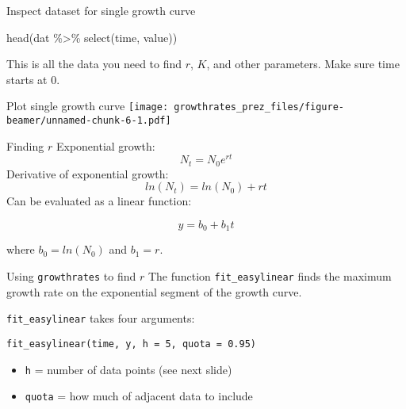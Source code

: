 \documentclass[
  ignorenonframetext,
]{beamer}
\newenvironment{Shaded}{\begin{snugshade}}{\end{snugshade}}
\newcommand{\FunctionTok}[1]{\textcolor[rgb]{0.00,0.00,0.00}{#1}}
\newcommand{\NormalTok}[1]{#1}
\newcommand{\SpecialCharTok}[1]{\textcolor[rgb]{0.00,0.00,0.00}{#1}}
\providecommand{\tightlist}{%
  \setlength{\itemsep}{0pt}\setlength{\parskip}{0pt}}
\begin{document}
\begin{frame}[fragile]{Inspect dataset for single growth curve}
\protect\hypertarget{inspect-dataset-for-single-growth-curve}{}
\begin{Shaded}
\begin{Highlighting}[]
\FunctionTok{head}\NormalTok{(dat }\SpecialCharTok{\%\textgreater{}\%}
       \FunctionTok{select}\NormalTok{(time, value))}
\end{Highlighting}
\end{Shaded}

This is all the data you need to find \(r\), \(K\), and other
parameters. Make sure time starts at 0.
\end{frame}

\begin{frame}{Plot single growth curve}
\protect\hypertarget{plot-single-growth-curve}{}
\texttt{[image: growthrates\_prez\_files/figure-beamer/unnamed-chunk-6-1.pdf]}
\end{frame}

\begin{frame}{Finding \(r\)}
\protect\hypertarget{finding-r}{}
Exponential growth: \[N_t = N_0 e^{rt}\] Derivative of exponential
growth: \[ln(N_t) = ln(N_0) + rt\] Can be evaluated as a linear
function:

\[y = b_0 + b_1 t\]

where \(b_0 = ln(N_0)\) and \(b_1 = r\).
\end{frame}

\begin{frame}[fragile]{Using \texttt{growthrates} to find \(r\)}
\protect\hypertarget{using-growthrates-to-find-r}{}
The function \texttt{fit\_easylinear} finds the maximum growth rate on
the exponential segment of the growth curve.

\texttt{fit\_easylinear} takes four arguments:

\texttt{fit\_easylinear(time,\ y,\ h\ =\ 5,\ quota\ =\ 0.95)}

\begin{itemize}
\tightlist
\item
  \texttt{h} = number of data points (see next slide)
\item
  \texttt{quota} = how much of adjacent data to include
\end{itemize}
\end{frame}
\end{document}
